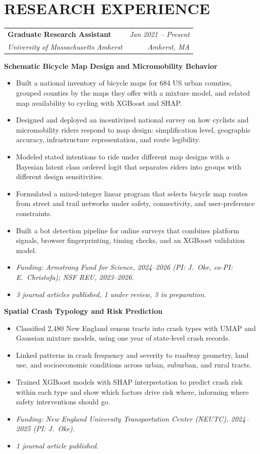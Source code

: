 \documentclass[10pt, a4paper]{article}
\makeatletter
\newcommand{\entry}[4]{%
  \noindent
  \begin{tabularx}{\linewidth}{@{}X@{\hspace{4pt}}r@{}}
    \textbf{#1} & \textit{\small\color{subtle}#2} \\
    \textit{\small\color{subtle}#3} & \textit{\small\color{subtle}#4}
  \end{tabularx}\vspace{2pt}%
}
\makeatother
\begin{document}
\section{RESEARCH EXPERIENCE}

\entry{Graduate Research Assistant}{Jan 2021 -- Present}
      {University of Massachusetts Amherst}{Amherst, MA}

\vspace{4pt}
\textbf{Schematic Bicycle Map Design and Micromobility Behavior}
\begin{itemize}
  \item Built a national inventory of bicycle maps for 684 US urban counties, grouped counties by the maps they offer with a mixture model, and related map availability to cycling with XGBoost and SHAP.
  \item Designed and deployed an incentivized national survey on how cyclists and micromobility riders respond to map design: simplification level, geographic accuracy, infrastructure representation, and route legibility.
  \item Modeled stated intentions to ride under different map designs with a Bayesian latent class ordered logit that separates riders into groups with different design sensitivities.
  \item Formulated a mixed-integer linear program that selects bicycle map routes from street and trail networks under safety, connectivity, and user-preference constraints.
  \item Built a bot detection pipeline for online surveys that combines platform signals, browser fingerprinting, timing checks, and an XGBoost validation model.
  \item \textit{Funding: Armstrong Fund for Science, 2024--2026 (PI: J.~Oke, co-PI: E.~Christofa); NSF REU, 2023--2026.}
  \item \textit{3 journal articles published, 1 under review, 3 in preparation.}
\end{itemize}

\vspace{4pt}
\textbf{Spatial Crash Typology and Risk Prediction}
\begin{itemize}
  \item Classified 2,480 New England census tracts into crash types with UMAP and Gaussian mixture models, using one year of state-level crash records.
  \item Linked patterns in crash frequency and severity to roadway geometry, land use, and socioeconomic conditions across urban, suburban, and rural tracts.
  \item Trained XGBoost models with SHAP interpretation to predict crash risk within each type and show which factors drive risk where, informing where safety interventions should go.
  \item \textit{Funding: New England University Transportation Center (NEUTC), 2024--2025 (PI: J.~Oke).}
  \item \textit{1 journal article published.}
\end{itemize}
\end{document}
